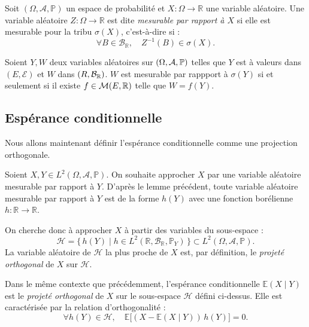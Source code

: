 \begin{definition}
    Soit $(\Omega, \mathcal{A}, \mathbb{P})$ un espace de probabilité et $X : \Omega \to \mathbb{R}$ une variable aléatoire. 
    Une variable aléatoire $Z : \Omega \to \mathbb{R}$ est dite \emph{mesurable par rapport à $X$} si elle est mesurable 
    pour la tribu $\sigma(X)$, c’est-à-dire si :
    \[
        \forall B \in \mathcal{B}_{\mathbb{R}}, \quad Z^{-1}(B) \in \sigma(X).
    \]
\end{definition}

\begin{lemma}
    Soient $Y,W$ deux variables aléatoires sur $( \Omega, \mathcal{A}, \mathbb{P})$ telles que $Y$ est à valeurs 
    dans $ (E, \mathcal{E} )$ et $W$ dans $(R, \mathcal{B}_{\mathbb{R}})$. $W$ est mesurable par rappport à $ \sigma(Y)$ 
    si et seulement si il existe $f \in \mathcal{M}(E,\mathbb{R}) $ telle que $W = f(Y)$. 
\end{lemma}


\subsection{Espérance conditionnelle}

Nous allons maintenant définir l'espérance conditionnelle comme une projection orthogonale.

\begin{proposition}
    Soient $X, Y \in L^2(\Omega, \mathcal{A}, \mathbb{P})$. 
    On souhaite approcher $X$ par une variable aléatoire mesurable par rapport à $Y$. 
    D'après le lemme précédent, toute variable aléatoire mesurable par rapport à $Y$ 
    est de la forme $h(Y)$ avec une fonction borélienne $h : \mathbb{R} \to \mathbb{R}$.

    On cherche donc à approcher $X$ à partir des variables du sous-espace :
    \[
        \mathcal{H} = \{\, h(Y) \mid h \in L^2(\mathbb{R}, \mathcal{B}_{\mathbb{R}}, \mathbb{P}_Y) \,\}
        \subset L^2(\Omega, \mathcal{A}, \mathbb{P}).
    \]
    La variable aléatoire de $\mathcal{H}$ la plus proche de $X$ 
    est, par définition, le \emph{projeté orthogonal} de $X$ sur $\mathcal{H}$.
\end{proposition}

\begin{definition}
    Dans le même contexte que précédemment, 
    l'espérance conditionnelle $\mathbb{E}(X \mid Y)$ est le \emph{projeté orthogonal} 
    de $X$ sur le sous-espace $\mathcal{H}$ défini ci-dessus. 
    Elle est caractérisée par la relation d’orthogonalité :
    \[
        \forall h(Y) \in \mathcal{H}, 
        \quad \mathbb{E}\big[(X - \mathbb{E}(X \mid Y))\,h(Y)\big] = 0.
    \]
\end{definition}

